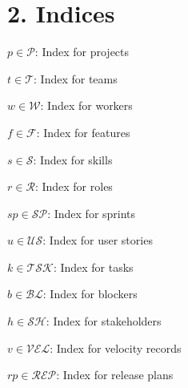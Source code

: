 \documentclass[12pt]{article}
\begin{document}
\section{2. Indices}
\item $p \in \mathcal{P}$: Index for projects
    \item $t \in \mathcal{T}$: Index for teams
    \item $w \in \mathcal{W}$: Index for workers
    \item $f \in \mathcal{F}$: Index for features
    \item $s \in \mathcal{S}$: Index for skills
    \item $r \in \mathcal{R}$: Index for roles
    \item $sp \in \mathcal{SP}$: Index for sprints
    \item $u \in \mathcal{US}$: Index for user stories
    \item $k \in \mathcal{TSK}$: Index for tasks
    \item $b \in \mathcal{BL}$: Index for blockers
    \item $h \in \mathcal{SH}$: Index for stakeholders
    \item $v \in \mathcal{VEL}$: Index for velocity records
    \item $rp \in \mathcal{REP}$: Index for release plans
\end{document}
